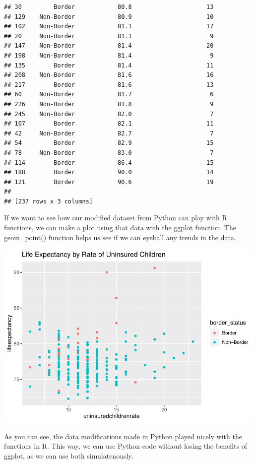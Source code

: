 \documentclass[]{article}
\newenvironment{Shaded}{\begin{snugshade}}{\end{snugshade}}
\newcommand{\DataTypeTok}[1]{\textcolor[rgb]{0.13,0.29,0.53}{#1}}
\newcommand{\KeywordTok}[1]{\textcolor[rgb]{0.13,0.29,0.53}{\textbf{#1}}}
\newcommand{\NormalTok}[1]{#1}
\newcommand{\OperatorTok}[1]{\textcolor[rgb]{0.81,0.36,0.00}{\textbf{#1}}}
\newcommand{\StringTok}[1]{\textcolor[rgb]{0.31,0.60,0.02}{#1}}
\begin{document}
\begin{verbatim}
## 30         Border            80.8                     13
## 129    Non-Border            80.9                     10
## 102    Non-Border            81.1                     17
## 20     Non-Border            81.1                      9
## 147    Non-Border            81.4                     20
## 198    Non-Border            81.4                      9
## 135        Border            81.4                     11
## 208    Non-Border            81.6                     16
## 217        Border            81.6                     13
## 60     Non-Border            81.7                      6
## 226    Non-Border            81.8                      9
## 245    Non-Border            82.0                      7
## 107        Border            82.1                     11
## 42     Non-Border            82.7                      7
## 54         Border            82.9                     15
## 78     Non-Border            83.0                      7
## 114        Border            86.4                     15
## 188        Border            90.0                     14
## 121        Border            90.6                     19
## 
## [237 rows x 3 columns]
\end{verbatim}

If we want to see how our modified dataset from Python can play with R
functions, we can make a plot using that data with the ggplot function.
The geom\_point() function helps us see if we can eyeball any trends in
the data.

\begin{Shaded}
\end{Shaded}

\includegraphics{2020-05-10-using-both-r-and-python-to-manipulate-data_files/figure-latex/unnamed-chunk-3-1.pdf}

As you can see, the data modifications made in Python played nicely with
the functions in R. This way, we can use Python code without losing the
benefits of ggplot, as we can use both simulatenously.
\end{document}
